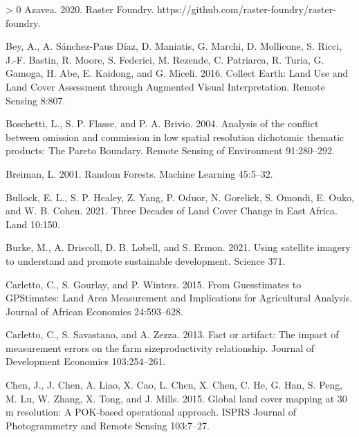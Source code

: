 \documentclass[11pt,a4paper]{article}
\newlength{\cslhangindent}
\newenvironment{CSLReferences}[3] %
 {%
  \setlength{\parindent}{0pt}
  \ifodd #1 \everypar{\setlength{\hangindent}{\cslhangindent}}\ignorespaces\fi
  \ifnum #2 > 0
  \setlength{\parskip}{#2\baselineskip}
  \fi
 }%
 {}
\begin{document}
\hypertarget{refs}{}
\begin{CSLReferences}{1}{0}
\leavevmode\hypertarget{ref-azaveaRasterFoundry2020}{}%
Azavea. 2020. Raster {Foundry}.
https://github.com/raster-foundry/raster-foundry.

\leavevmode\hypertarget{ref-BeyCollectEarthLand2016}{}%
Bey, A., A. Sánchez-Paus Díaz, D. Maniatis, G. Marchi, D. Mollicone, S.
Ricci, J.-F. Bastin, R. Moore, S. Federici, M. Rezende, C. Patriarca, R.
Turia, G. Gamoga, H. Abe, E. Kaidong, and G. Miceli. 2016. Collect
{Earth}: Land {Use} and {Land Cover Assessment} through {Augmented
Visual Interpretation}. Remote Sensing 8:807.

\leavevmode\hypertarget{ref-boschettiAnalysisConflictOmission2004}{}%
Boschetti, L., S. P. Flasse, and P. A. Brivio. 2004. Analysis of the
conflict between omission and commission in low spatial resolution
dichotomic thematic products: The {Pareto Boundary}. Remote Sensing of
Environment 91:280--292.

\leavevmode\hypertarget{ref-BreimanRandomForests2001}{}%
Breiman, L. 2001. Random {Forests}. Machine Learning 45:5--32.

\leavevmode\hypertarget{ref-bullockThreeDecadesLand2021}{}%
Bullock, E. L., S. P. Healey, Z. Yang, P. Oduor, N. Gorelick, S. Omondi,
E. Ouko, and W. B. Cohen. 2021. Three {Decades} of {Land Cover Change}
in {East Africa}. Land 10:150.

\leavevmode\hypertarget{ref-burkeUsingSatelliteImagery2021}{}%
Burke, M., A. Driscoll, D. B. Lobell, and S. Ermon. 2021. Using
satellite imagery to understand and promote sustainable development.
Science 371.

\leavevmode\hypertarget{ref-CarlettoGuesstimatesGPStimatesLand2015}{}%
Carletto, C., S. Gourlay, and P. Winters. 2015. From {Guesstimates} to
{GPStimates}: Land {Area Measurement} and {Implications} for
{Agricultural Analysis}. Journal of African Economies 24:593--628.

\leavevmode\hypertarget{ref-CarlettoFactartifactimpact2013}{}%
Carletto, C., S. Savastano, and A. Zezza. 2013. Fact or artifact: The
impact of measurement errors on the farm size{}productivity
relationship. Journal of Development Economics 103:254--261.

\leavevmode\hypertarget{ref-ChenGloballandcover2015}{}%
Chen, J., J. Chen, A. Liao, X. Cao, L. Chen, X. Chen, C. He, G. Han, S.
Peng, M. Lu, W. Zhang, X. Tong, and J. Mills. 2015. Global land cover
mapping at 30 m resolution: A {POK}-based operational approach. ISPRS
Journal of Photogrammetry and Remote Sensing 103:7--27.


\end{CSLReferences}
\end{document}
